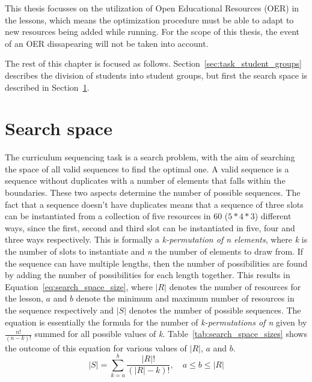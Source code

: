 This thesis focusses on the utilization of Open Educational Resources (OER) in the
lessons, which means the optimization procedure must be able to adapt to new
resources being added while running. For the scope of this thesis, the event of
an OER dissapearing will not be taken into account.

The rest of this chapter is focused as follows.
Section~\ref{sec:task_student_groups} describes the division of students into
student groups, but first the search space is described in
Section~\ref{sec:task_search_space}.

\section{Search space}
\label{sec:task_search_space}
The curriculum sequencing task is a search problem, with the aim of searching the
space of all valid sequences to find the optimal one. A valid sequence is a
sequence without duplicates with a number of elements that falls within the
boundaries. These two aspects determine the number of possible sequences. 
The fact that a sequence doesn't have duplicates means that a
sequence of three slots can be instantiated from a collection of five resources in
60 ($5*4*3$) different ways, since the first, second and third slot can be
instantiated in five, four and three ways respectively. This is formally a
\emph{k-permutation of n elements}, where \emph{k} is the number of slots to
instantiate and \emph{n} the number of elements to draw from.
If the sequence can have multiple lengths, then the number of
possibilities are found by adding the
number of possibilities for each length together. This results in
Equation~\ref{eq:search_space_size}, where $|R|$ denotes the number of
resources for the lesson, $a$ and $b$ denote the minimum and maximum number of
resources in the sequence respectively and $|S|$ denotes the number of possible
sequences. The equation is essentially the formula for the number of
\emph{k-permutations of n} given by $\tfrac{n!}{(n-k)!}$ summed for all
possible values of \emph{k}.
Table~\ref{tab:search_space_sizes} shows the outcome of this 
equation for various values of $|R|$, $a$ and $b$.
\begin{equation}
	\label{eq:search_space_size}
	|S| = \sum_{k=a}^{b} \frac{|R|!}{(|R|-k)!}, \quad a \le b \le |R|
\end{equation}
